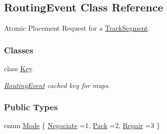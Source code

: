 \hypertarget{classKite_1_1RoutingEvent}{}\subsection{Routing\+Event Class Reference}
\label{classKite_1_1RoutingEvent}


Atomic Placement Request for a \mbox{\hyperlink{classKite_1_1TrackSegment}{Track\+Segment}}.  


\subsubsection*{Classes}
\begin{DoxyCompactItemize}
\item 
class \mbox{\hyperlink{classKite_1_1RoutingEvent_1_1Key}{Key}}
\begin{DoxyCompactList}\small\item\em \mbox{\hyperlink{classKite_1_1RoutingEvent}{Routing\+Event}} cached key for maps. \end{DoxyCompactList}\end{DoxyCompactItemize}
\subsubsection*{Public Types}
\begin{DoxyCompactItemize}
\item 
enum \mbox{\hyperlink{classKite_1_1RoutingEvent_a46c8a310cf4c094f8c80e1cb8dc1f911}{Mode}} \{ \newline
\mbox{\hyperlink{classKite_1_1RoutingEvent_a46c8a310cf4c094f8c80e1cb8dc1f911a3980b02882c46c9bd4caf15040b85d1a}{Negociate}} =1, 
\newline
\mbox{\hyperlink{classKite_1_1RoutingEvent_a46c8a310cf4c094f8c80e1cb8dc1f911a5afe185b48d7acf013dd5ccadc5b2414}{Pack}} =2, 
\newline
\mbox{\hyperlink{classKite_1_1RoutingEvent_a46c8a310cf4c094f8c80e1cb8dc1f911a27b403019a93f9f127cf64a0688a8288}{Repair}} =3
 \}
\end{DoxyCompactItemize}
